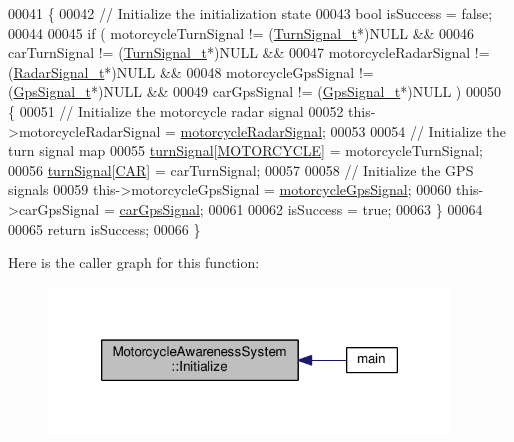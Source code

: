 \begin{DoxyCode}
00041 \{
00042     \textcolor{comment}{// Initialize the initialization state}
00043     \textcolor{keywordtype}{bool} isSuccess = \textcolor{keyword}{false};
00044 
00045     \textcolor{keywordflow}{if} ( motorcycleTurnSignal != (\hyperlink{structTurnSignal__t}{TurnSignal\_t}*)NULL &&
00046          carTurnSignal != (\hyperlink{structTurnSignal__t}{TurnSignal\_t}*)NULL &&
00047          motorcycleRadarSignal != (\hyperlink{structRadarSignal__t}{RadarSignal\_t}*)NULL &&
00048          motorcycleGpsSignal != (\hyperlink{structGpsSignal__t}{GpsSignal\_t}*)NULL &&
00049          carGpsSignal != (\hyperlink{structGpsSignal__t}{GpsSignal\_t}*)NULL )
00050     \{
00051         \textcolor{comment}{// Initialize the motorcycle radar signal}
00052         this->motorcycleRadarSignal = \hyperlink{classMotorcycleAwarenessSystem_a0744e71b9f440a86f5078c876ba7629b}{motorcycleRadarSignal};
00053 
00054         \textcolor{comment}{// Initialize the turn signal map}
00055         \hyperlink{classMotorcycleAwarenessSystem_a43fde090639a3a58fc5bbf8bafc966f7}{turnSignal}[\hyperlink{MotorcycleAwarenessSystemTypes_8hpp_a0c05c42b98a847f971385c81c2a81afaa39b983b1f7acfc4e7c900d77b0fded6a}{MOTORCYCLE}] = motorcycleTurnSignal;
00056         \hyperlink{classMotorcycleAwarenessSystem_a43fde090639a3a58fc5bbf8bafc966f7}{turnSignal}[\hyperlink{MotorcycleAwarenessSystemTypes_8hpp_a0c05c42b98a847f971385c81c2a81afaa5fc54ebcb1dd4bf1e1b93cbc77b57b40}{CAR}] = carTurnSignal;
00057 
00058         \textcolor{comment}{// Initialize the GPS signals}
00059         this->motorcycleGpsSignal = \hyperlink{classMotorcycleAwarenessSystem_ab281a3993b574923b2f379ed0477b2d4}{motorcycleGpsSignal};
00060         this->carGpsSignal = \hyperlink{classMotorcycleAwarenessSystem_a9a8185e00b60d0be58bfa76166063128}{carGpsSignal};
00061 
00062         isSuccess = \textcolor{keyword}{true};
00063     \}
00064 
00065     \textcolor{keywordflow}{return} isSuccess;
00066 \}
\end{DoxyCode}


Here is the caller graph for this function\-:\nopagebreak
\begin{figure}[H]
\begin{center}
\leavevmode
\includegraphics[width=302pt]{classMotorcycleAwarenessSystem_a341f27867c8d6aa0865040279ee246a9_icgraph}
\end{center}
\end{figure}


